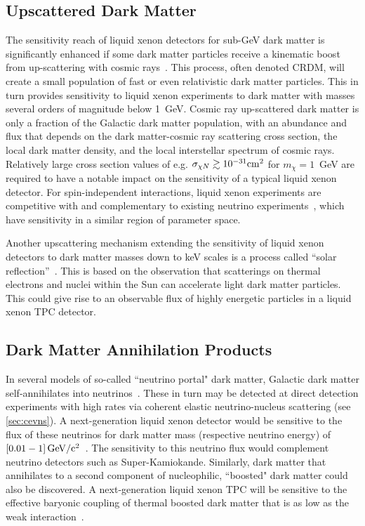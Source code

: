 \subsection{Upscattered Dark Matter}\label{sec:upscattdm}

The sensitivity reach of liquid xenon detectors for sub-GeV dark matter is significantly enhanced if some dark matter particles receive a kinematic boost from up-scattering with cosmic rays~\cite{Bringmann:2018cvk,Alvey:2019zaa,Cappiello:2019qsw,Dent:2019krz,Bondarenko:2019vrb,Wang:2019jtk}. This process, often denoted CRDM, will create a small population of fast or even relativistic dark matter particles. This in turn provides sensitivity to liquid xenon experiments to dark matter with masses several orders of magnitude below 1~GeV. Cosmic ray up-scattered dark matter is only a fraction of the Galactic dark matter population, with an abundance and flux that depends on the dark matter-cosmic ray scattering cross section, the local dark matter density, and the local interstellar spectrum of cosmic rays. Relatively large cross section values of e.g. $\sigma_{\chi N}\gtrsim 10^{-31}{\rm{cm}}^2$ for $m_\chi = 1$~GeV are required to have a notable impact on the sensitivity of a typical liquid xenon detector. For spin-independent interactions, liquid xenon experiments are competitive with and complementary to existing neutrino experiments~\cite{Bringmann:2018cvk, Cappiello:2019qsw,  PROSPECT:2021awi}, which have sensitivity in a similar region of parameter space.

Another upscattering mechanism extending the sensitivity of liquid xenon detectors to dark matter masses down to keV scales is a process called ``solar reflection''~\cite{An:2017ojc,Emken:2017hnp}. This is based on the observation that scatterings on thermal electrons and nuclei within the Sun can accelerate light dark matter particles. This could give rise to an observable flux of highly energetic particles in a liquid xenon TPC detector.

\subsection{Dark Matter Annihilation Products}\label{sec:dmproducts}

In several models of so-called ``neutrino portal" dark matter, Galactic dark matter self-annihilates into neutrinos~\cite{Cherry:2014xra,GonzalezMacias:2015xbi,Becker:2018rve,Lamprea:2019qet,Patel:2019zky}. These in turn may be detected at direct detection experiments with high rates via coherent elastic neutrino-nucleus scattering (see \autoref{sec:cevns}). A next-generation liquid xenon detector would be sensitive to the flux of these neutrinos for dark matter mass (respective neutrino energy) of $[0.01-1]\, \mathrm{GeV/c^2}$~\cite{McKeen:2018pbb}. The sensitivity to this neutrino flux would complement neutrino detectors such as Super-Kamiokande. Similarly, dark matter that annihilates to a second component of nucleophilic, ``boosted" dark matter could also be discovered. A next-generation liquid xenon TPC will be sensitive to the effective baryonic coupling of thermal boosted dark matter that is as low as the weak interaction~\cite{McKeen:2018pbb}.

